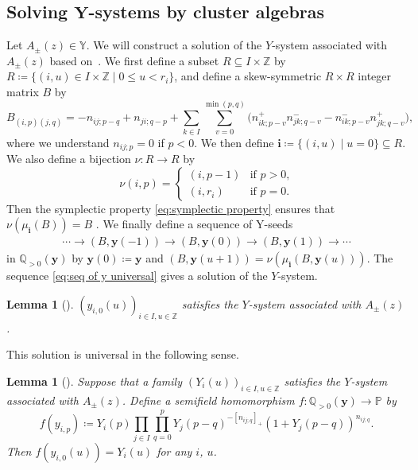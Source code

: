 \documentclass[pdftex]{sigma}
\numberwithin{equation}{section}
\newtheorem{Lemma}[Theorem]{Lemma}
\theoremstyle{definition}
\newcommand*{\maxzero}[1]{[#1]_{+}}
\begin{document}
\subsection[Solving Y-systems by cluster algebras]{Solving $\boldsymbol{ Y}$-systems by cluster algebras}
Let $A_\pm (z) \in \mathbb{Y}$.
We will construct a solution
of the $Y$-system associated with $A_\pm (z)$ based on~\cite[Section 3.3]{mizuno2020difference}.
We first define a subset $R \subseteq I \times \mathbb{Z}$ by
$
 R\coloneqq \{(i, u) \in I \times \mathbb{Z} \mid 0 \leq u < r_i \}$,
and define a skew-symmetric $R \times R$ integer matrix $B$ by
\begin{equation}\label{eq:def of B from cap}
 B_{(i, p)(j, q)} = - n_{ij;p-q} + n_{ji;q-p} +\sum_{k \in I} \sum_{v=0}^{\min(p,q)}
 \bigl( n_{ik;p-v}^{+} {n}_{jk;q-v}^{-}
 - n_{ik;p-v}^{-} {n}_{jk;q-v}^{+} \bigr),
\end{equation}
where we understand $n_{ij;p} = 0$ if $p < 0$.
We then define $\boldsymbol{i} \coloneqq \{ (i, u) \mid u=0 \} \subseteq R$.
We also define a bijection $\nu \colon R \to R$ by
\[%
	\nu (i, p) =
	\begin{cases}
		(i, p - 1) &\text{if $p > 0$,}\\
		(i, r_i) &\text{if $p=0$.}
	\end{cases}
\]
Then the symplectic property \eqref{eq:symplectic property} ensures that $\nu(\mu_{\boldsymbol{i}} (B)) = B$ \cite[Lemma 3.16]{mizuno2020difference}.
We finally define a sequence of Y-seeds
\begin{align}\label{eq:seq of y universal}
 \cdots \to (B, \boldsymbol{y}(-1)) \to (B, \boldsymbol{y}(0)) \to (B, \boldsymbol{y}(1)) \to \cdots
\end{align}
in $\mathbb{Q}_{> 0}(\boldsymbol{y})$ by
$\boldsymbol{y}(0) \coloneqq \boldsymbol{y}$ and
$(B, \boldsymbol{y}(u+1)) = \nu (\mu_{\boldsymbol{i}} (B, \boldsymbol{y}(u)))$.
The sequence \eqref{eq:seq of y universal} gives a solution of the $Y$-system.

\begin{Lemma}[{\cite[Theorem 3.13]{mizuno2020difference}}]\label{lemma:universal solution}
 $(y_{i, 0} (u))_{i \in I, u \in \mathbb{Z}}$ satisfies the $Y$-system associated with $A_\pm(z)$.
\end{Lemma}

This solution is universal in the following sense.
\begin{Lemma}[{\cite[Theorem 3.19]{mizuno2020difference}}]
 Suppose that a family $(Y_i(u))_{i \in I, u \in \mathbb{Z}}$ satisfies the $Y$-system associated with $A_\pm(z)$.
 Define a semifield homomorphism $f \colon \mathbb{Q}_{>0} (\boldsymbol{y}) \to \mathbb{P}$ by
 \[
		f(y_{i, p}) \coloneqq
 Y_i(p) \prod_{j \in I} \prod_{q=0}^{p} Y_j (p-q)^{- \maxzero{ n_{ij;q} }} (1 + Y_j (p-q) )^{n_{ij;q}}.
	\]
 Then $f(y_{i, 0} (u)) = Y_i(u)$ for any $i$, $u$.
\end{Lemma}
\end{document}
